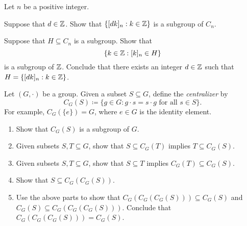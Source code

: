 \documentclass[../notes.tex]{subfiles}
\begin{document}
\begin{homework}
    Let $n$ be a positive integer.
    \begin{listalph}
        \item Suppose that $d\in\mathbb Z$. Show that $\{[dk]_n:k\in\mathbb Z\}$ is a subgroup of $C_n$.
        \item Suppose that $H\subseteq C_n$ is a subgroup. Show that
        \[\{k\in\mathbb Z:[k]_n\in H\}\]
        is a subgroup of $\mathbb Z$. Conclude that there exists an integer $d\in\mathbb Z$ such that $H=\{[dk]_n:k\in\mathbb Z\}$.
    \end{listalph}
\end{homework}

\begin{homework}
    Let $(G,\cdot)$ be a group. Given a subset $S\subseteq G$, define the \textit{centralizer} by
    \[C_G(S)\coloneqq\{g\in G:g\cdot s=s\cdot g\text{ for all }s\in S\}.\]
    For example, $C_G(\{e\})=G$, where $e\in G$ is the identity element.
    \begin{enumerate}[label=(\alph*)]
        \item Show that $C_G(S)$ is a subgroup of $G$.
        \item Given subsets $S,T\subseteq G$, show that $S\subseteq C_G(T)$ implies $T\subseteq C_G(S)$.
        \item Given subsets $S,T\subseteq G$, show that $S\subseteq T$ implies $C_G(T)\subseteq C_G(S)$.
        \item Show that $S\subseteq C_G(C_G(S))$.
        \item Use the above parts to show that $C_G(C_G(C_G(S)))\subseteq C_G(S)$ and $C_G(S)\subseteq C_G(C_G(C_G(S)))$. Conclude that $C_G(C_G(C_G(S)))=C_G(S)$.
    \end{enumerate}
\end{homework}
\end{document}
